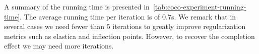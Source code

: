 \documentclass[review]{siamart220329}
\begin{document}
A summary of the running time is presented in~\cref{tab:coco-experiment-running-time}. The average running time per iteration is of $0.7$s. We remark that in several cases we need fewer than $5$ iterations to greatly improve regularization metrics such as elastica and inflection points. However, to recover the completion effect we may need more iterations.
%
%
\begin{figure}
\center
{}


\end{figure}
\end{document}
